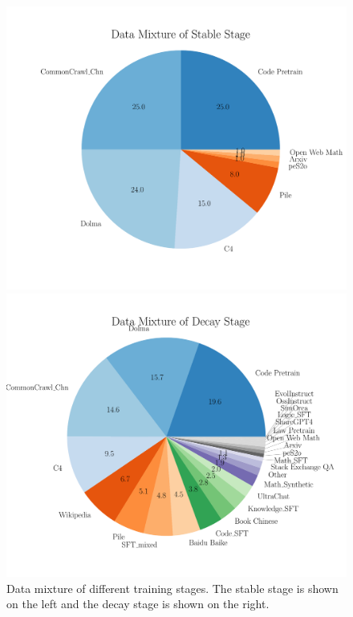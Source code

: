 \begin{figure}[htbp]
    \centering
    \begin{minipage}{0.48\linewidth}
        \centering
        \includegraphics[width=1.0\linewidth]{Fig/stable_mixture.pdf}
    \end{minipage}
    \hfill 
    \begin{minipage}{0.48\linewidth}
        \centering
        \includegraphics[width=1.0\linewidth]{Fig/decay_data_mixture.pdf}
    \end{minipage}
    \caption{Data mixture of different training stages. The stable stage is shown on the left and the decay stage is shown on the right.}
        \label{fig:appdatamixture}
\end{figure}


